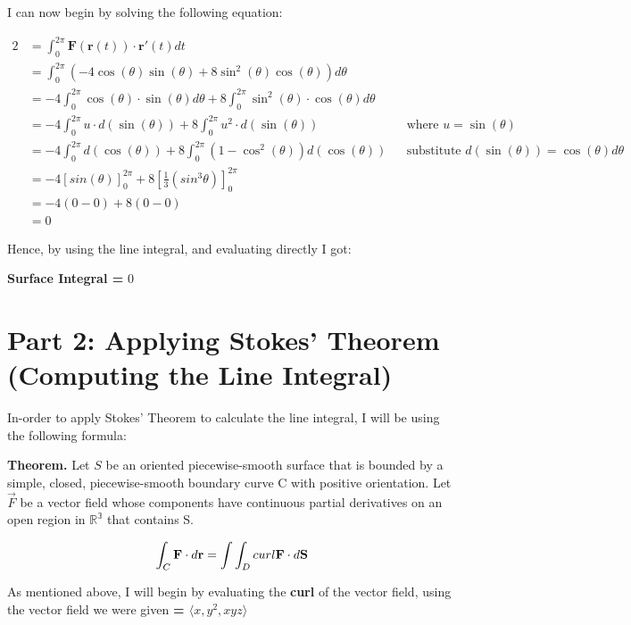 \documentclass[a4paper]{article}
\begin{document}
I can now begin by solving the following equation:

\begin{alignat}{2}
    &= \int_0^{2\pi} \mathbf{F}(\mathbf{r}(t)) \cdot \mathbf{r}'(t) dt && \\
    &= \int_0^{2\pi} (-4\cos(\theta) \sin(\theta) + 8\sin^2(\theta) \cos(\theta)) d\theta && \\
    &= -4\int_0^{2\pi} \cos(\theta) \cdot \sin(\theta) d\theta + 8\int_0^{2\pi} \sin^2(\theta) \cdot \cos(\theta) d\theta && \\
    &= -4\int_0^{2\pi} u \cdot d(\sin(\theta)) + 8\int_0^{2\pi} u^2 \cdot d(\sin(\theta)) && \text{where } u = \sin(\theta) \\
    &= -4\int_0^{2\pi} d(\cos(\theta)) + 8\int_0^{2\pi} (1 - \cos^2(\theta)) d(\cos(\theta)) && \text{substitute } d(\sin(\theta)) = \cos(\theta) d\theta \\
    &= -4[sin(\theta)]_0^{2\pi} + 8[\frac{1}{3}(sin^3\theta)]_0^{2\pi} && \\
    &= -4(0 - 0) + 8(0 - 0) \\
    &= 0
\end{alignat}

Hence, by using the line integral, and evaluating directly I got:

\begin{center}
    \textbf{Surface Integral = } 0
\end{center}

\section{Part 2: Applying Stokes’ Theorem (Computing the Line Integral)}

In-order to apply Stokes' Theorem to calculate the line integral, I will be using the following formula:


\textbf{Theorem.} Let $S$ be an oriented piecewise-smooth surface that is bounded by a simple, closed, piecewise-smooth boundary curve C with positive orientation. Let $\vec{F}$ be a vector field whose components have continuous partial derivatives on an open region in $\mathbb{R^3}$  that contains S.

\begin{equation}
    \int_C \mathbf{F} \cdot d\mathbf{r} = \int \int_D curl \text{\textbf{F}} \cdot d\textbf{S} 
\end{equation}

As mentioned above, I will begin by evaluating the \textbf{curl} of the vector field, using the vector field we were given \textbf{ = $\langle x,y^2,xyz \rangle$}
 \\ 
 
\end{document}
